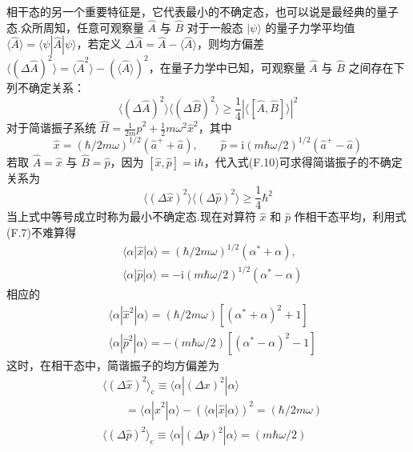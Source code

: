 相干态的另一个重要特征是，它代表最小的不确定态，也可以说是最经典的量子态.众所周知，任意可观察量 $\hat{A}$ 与 $\hat{B}$ 对于一般态 $|\psi\rangle$ 的量子力学平均值 $\langle\hat{A}\rangle=\langle\psi|\hat{A}|\psi\rangle$，若定义 $\Delta\hat{A}=\hat{A}-\langle\hat{A}\rangle$，则均方偏差 $\langle(\Delta\hat{A})^{2}\rangle=\langle\hat{A}^{2}\rangle-(\langle\hat{A}\rangle)^{2}$，在量子力学中已知，可观察量 $\hat{A}$ 与 $\hat{B}$ 之间存在下列不确定关系：
\begin{equation}
  \langle(\Delta\hat{A})^{2}\rangle
  \langle(\Delta\hat{B})^{2}\rangle
  \geqslant\frac{1}{4}
  \left|\langle[\hat{A},\hat{B}]\rangle\right|^{2}
\end{equation}
对于简谐振子系统 $\hat{H}=\frac{1}{2m}\hat{p}^{2}
+\frac{1}{2}m\omega^{2}\hat{x}^{2}$，其中
\begin{equation}
  \hat{x}=\left(\hbar/2m\omega\right)^{1/2}
  \left(\hat{a}^{+}+\hat{a}\right)
  ,\qquad
  \hat{p}=\mathrm{i}\left(m\hbar\omega/2\right)^{1/2}
  \left(\hat{a}^{+}-\hat{a}\right)
\end{equation}
若取 $\hat{A}=\hat{x}$ 与 $\hat{B}=\hat{p}$，因为 $[\hat{x},\hat{p}]=\mathrm{i}\hbar$，代入式(F.10)可求得简谐振子的不确定关系为
\begin{equation}
  \langle(\Delta\hat{x})^{2}\rangle
  \langle(\Delta\hat{p})^{2}\rangle
  \geqslant\frac{1}{4}\hbar^{2}
\end{equation}
当上式中等号成立时称为最小不确定态.现在对算符 $\hat{x}$ 和 $\hat{p}$ 作相干态平均，利用式(F.7)不难算得
\begin{equation}
\begin{aligned}
  &\langle\alpha|\hat{x}|\alpha\rangle
  =\left(\hbar/2m\omega\right)^{1/2}
  \left(\alpha^{*}+\alpha\right)
  ,\\
  &\langle\alpha|\hat{p}|\alpha\rangle
  =-\mathrm{i}\left(m\hbar\omega/2\right)^{1/2}
  \left(\alpha^{*}-\alpha\right)
\end{aligned}
\end{equation}
相应的
\begin{equation}
\begin{aligned}
  &\langle\alpha|\hat{x}^{2}|\alpha\rangle
  =\left(\hbar/2m\omega\right)
  \left[\left(\alpha^{*}+\alpha\right)^{2}+1\right]\\
  &\langle\alpha|\hat{p}^{2}|\alpha\rangle
  =-\left(m\hbar\omega/2\right)
  \left[\left(\alpha^{*}-\alpha\right)^{2}-1\right]
\end{aligned}
\end{equation}
这时，在相干态中，简谐振子的均方偏差为
\begin{equation}
\begin{aligned}
  &\langle(\Delta\hat{x})^{2}\rangle_{\mathrm{c}}
  \equiv\langle\alpha|(\Delta x)^{2}|\alpha\rangle\\
  &\qquad=\langle\alpha|\hat{x}^{2}|\alpha\rangle
  -\left(\langle\alpha|\hat{x}|\alpha\rangle\right)^{2}
  =\left(\hbar/2m\omega\right)\\
  &\langle(\Delta\hat{p})^{2}\rangle_{\mathrm{c}}
  \equiv\langle\alpha|(\Delta p)^{2}|\alpha\rangle
  =\left(m\hbar\omega/2\right)
\end{aligned}
\end{equation}
